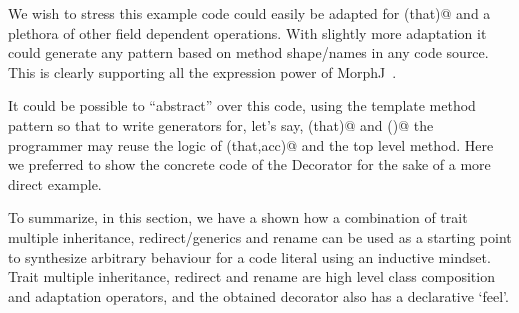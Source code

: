 We wish to stress this example code could easily be adapted for \Q@equals(that)@ and
a plethora of other field dependent operations.
With slightly more adaptation it could generate any pattern based on method shape/names in
any code source.
This is clearly supporting all the expression power of MorphJ~\cite{huang2008expressive}.

It could be possible to ``abstract'' over this code, using the template method pattern so that
to write generators for, let's say, \Q@equals(that)@ and \Q@toS()@ the programmer may reuse the logic of \Q@fold(that,acc)@ and the top level method.
Here we preferred to show the concrete code of the Decorator \Q@Stringable@ for the sake of a more
direct example.

To summarize, in this section, we have a shown how a combination of
trait multiple inheritance, redirect/generics and rename
can be used as a starting point to synthesize arbitrary behaviour for a
code literal using an inductive mindset.
Trait multiple inheritance, redirect and rename
are high level class composition and adaptation operators,
and the obtained decorator also has a declarative `feel'.




